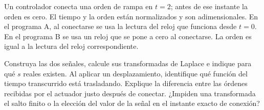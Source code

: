Un controlador conecta una orden de rampa en \(t=2\); antes de ese instante la orden es cero. El tiempo y la orden están normalizados y son adimensionales. En el programa A, al conectarse se usa la lectura del reloj que funciona desde \(t=0\). En el programa B se usa un reloj que se pone a cero al conectarse. La orden es igual a la lectura del reloj correspondiente.

Construya las dos señales, calcule sus transformadas de Laplace e indique para qué \(s\) reales existen. Al aplicar un desplazamiento, identifique qué función del tiempo transcurrido está trasladando. Explique la diferencia entre las órdenes recibidas por el actuador justo después de conectar. ¿Impiden una transformada el salto finito o la elección del valor de la señal en el instante exacto de conexión?
